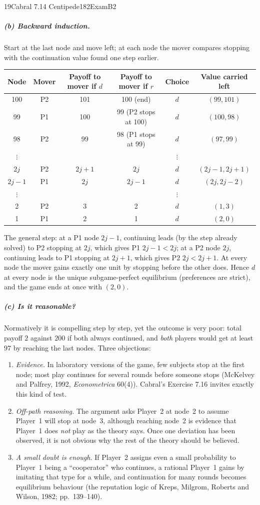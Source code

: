\begin{exsol}{19}{Cabral 7.14 Centipede}{182}{Exam}{B2}
\subparagraph{(b) Backward induction.} Start at the last node and move left; at each node the
mover compares stopping with the continuation value found one step earlier.
\begin{center}\small
\begin{tabular}{@{}cccccc@{}}
\toprule
Node & Mover & Payoff to mover if $d$ & Payoff to mover if $r$ & Choice & Value carried left \\
\midrule
100 & P2 & 101 & 100 (end) & $d$ & $(99,101)$ \\
99 & P1 & 100 & 99 (P2 stops at 100) & $d$ & $(100,98)$ \\
98 & P2 & 99 & 98 (P1 stops at 99) & $d$ & $(97,99)$ \\
$\vdots$ & & & & $\vdots$ & \\
$2j$ & P2 & $2j+1$ & $2j$ & $d$ & $(2j-1,2j+1)$ \\
$2j-1$ & P1 & $2j$ & $2j-1$ & $d$ & $(2j,2j-2)$ \\
$\vdots$ & & & & $\vdots$ & \\
2 & P2 & 3 & 2 & $d$ & $(1,3)$ \\
1 & P1 & 2 & 1 & $d$ & $(2,0)$ \\
\bottomrule
\end{tabular}
\end{center}
The general step: at a P1 node $2j-1$, continuing leads (by the step already solved) to P2
stopping at $2j$, which gives P1 $2j-1 < 2j$; at a P2 node $2j$, continuing leads to P1 stopping
at $2j+1$, which gives P2 $2j < 2j+1$. At every node the mover gains exactly one unit by stopping
before the other does. Hence $d$ at every node is the unique subgame-perfect equilibrium
(preferences are strict), and the game ends at once with $(2,0)$.

\subparagraph{(c) Is it reasonable?} Normatively it is compelling step by step, yet the outcome
is very poor: total payoff $2$ against $200$ if both always continued, and \emph{both} players
would get at least $97$ by reaching the last nodes. Three objections:
\begin{enumerate}[label=(\roman*)]
  \item \emph{Evidence.} In laboratory versions of the game, few subjects stop at the first node;
  most play continues for several rounds before someone stops (McKelvey and Palfrey, 1992,
  \emph{Econometrica} 60(4)). Cabral's Exercise 7.16 invites exactly this kind of test.
  \item \emph{Off-path reasoning.} The argument asks Player~2 at node~2 to assume Player~1 will
  stop at node~3, although reaching node~2 is evidence that Player~1 does \emph{not} play as the
  theory says. Once one deviation has been observed, it is not obvious why the rest of the
  theory should be believed.
  \item \emph{A small doubt is enough.} If Player~2 assigns even a small probability to Player~1
  being a ``cooperator'' who continues, a rational Player~1 gains by imitating that type for a
  while, and continuation for many rounds becomes equilibrium behaviour (the reputation logic of
  Kreps, Milgrom, Roberts and Wilson, 1982; \MR{} pp.~139--140).
\end{enumerate}


\end{exsol}
